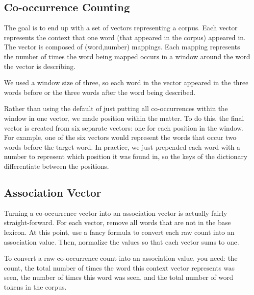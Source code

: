 \documentclass[12pt]{article}
\begin{document}
\subsection{Co-occurrence Counting}

The goal is to end up with a set of vectors representing a corpus. Each vector
represents the context that one word (that appeared in the corpus) appeared in.
The vector is composed of (word,number) mappings. Each mapping represents the
number of times the word being mapped occurs in a window around the word the
vector is describing.

We used a window size of three, so each word in the
vector appeared in the three words before or the three words after the word
being described.

Rather than using the default of just putting all co-occurrences within the
window in one vector, we made position within the matter. To do this, the
final vector is created from six separate vectors: one for each position in
the window. For example, one of the six vectors would represent the words that
occur two words before the target word. In practice, we just prepended each
word with a number to represent which position it was found in, so the keys of
the dictionary differentiate between the positions.

\subsection{Association Vector}

Turning a co-occurrence vector into an association vector is actually fairly
straight-forward. For each vector, remove all words that are not in the base
lexicon. At this point, use a fancy formula to convert each raw count into an
association value.  Then, normalize the values so that each vector sums to
one.

To convert a raw co-occurrence count into an association value, you need: the
count, the total number of times the word this context vector represents was
seen, the number of times this word was seen, and the total number of word
tokens in the corpus.
\end{document}
